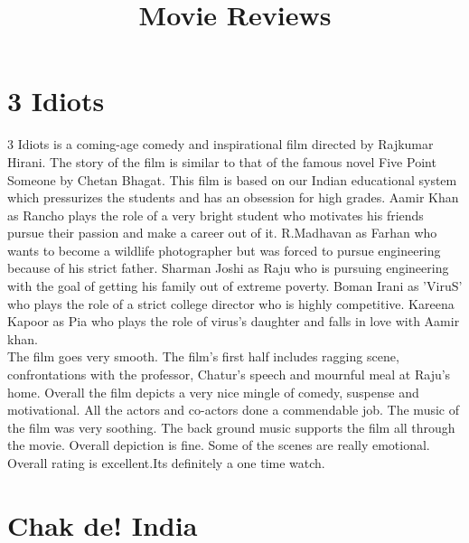 \documentclass[11pt]{article} %
\title{Movie Reviews}
\author{}
\begin{document}
\maketitle

\section{3 Idiots}
3 Idiots is a coming-age comedy and inspirational film directed by Rajkumar Hirani. The story of the film is similar to that of the famous novel Five Point Someone by Chetan Bhagat. This film is based on our Indian educational system which pressurizes the students and has an obsession for high grades.  Aamir Khan as Rancho plays the role of a very bright student who motivates his friends pursue their passion and make a career out of it. R.Madhavan as Farhan who wants to become a wildlife photographer but was forced to pursue engineering because of his strict father. Sharman Joshi as Raju who is pursuing engineering with the goal of getting his family out of extreme poverty. Boman Irani as 'ViruS' who plays the role of a strict college director who is highly competitive. Kareena Kapoor as Pia who plays the role of virus’s daughter and falls in love with Aamir khan.\\ 
The film goes very smooth. The film’s first half includes ragging scene, confrontations with the professor, Chatur’s speech and mournful meal at Raju’s home. Overall the film depicts a very nice mingle of comedy, suspense and motivational. All the actors and co-actors done a commendable job. The music of the film was very soothing. The back ground music supports the film all through the movie. Overall depiction is fine. Some of the scenes are really emotional. Overall rating is excellent.Its definitely a one time watch.

\section{Chak de! India}
\end{document}
